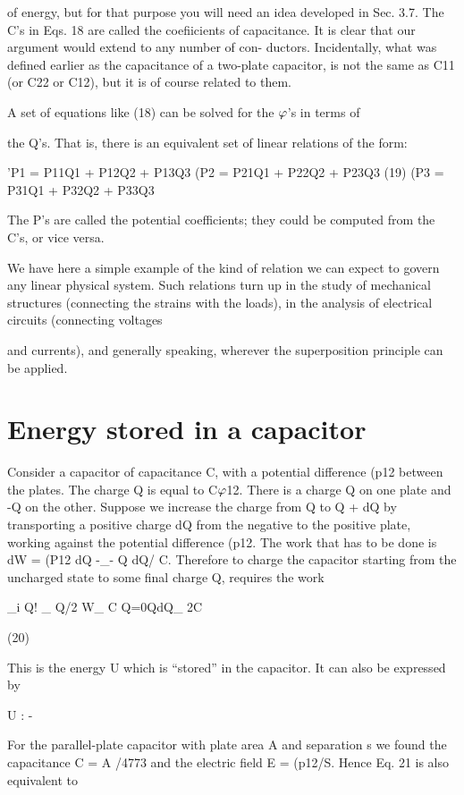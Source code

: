 of energy, but for that purpose you will need an idea developed in
Sec. 3.7. The C's in Eqs. 18 are called the coefiicients of capacitance.
It is clear that our argument would extend to any number of con-
ductors. Incidentally, what was defined earlier as the capacitance
of a two-plate capacitor, is not the same as C11 (or C22 or C12), but
it is of course related to them.

A set of equations like (18) can be solved for the $\varphi$'s in terms of

the Q's. That is, there is an equivalent set of linear relations of the
form:

'P1 = P11Q1 + P12Q2 + P13Q3
(P2 = P21Q1 + P22Q2 + P23Q3 (19)
(P3 = P31Q1 + P32Q2 + P33Q3

The P's are called the potential coefficients; they could be computed
from the C's, or vice versa.

We have here a simple example of the kind of relation we can
expect to govern any linear physical system. Such relations turn up
in the study of mechanical structures (connecting the strains with
the loads), in the analysis of electrical circuits (connecting voltages

and currents), and generally speaking, wherever the superposition
principle can be applied.

\section{Energy stored in a capacitor}

Consider a capacitor of capacitance C, with a potential difference
(p12 between the plates. The charge Q is equal to C$\varphi$12. There is a
charge Q on one plate and -Q on the other. Suppose we increase
the charge from Q to Q + dQ by transporting a positive charge dQ
from the negative to the positive plate, working against the potential
difference (p12. The work that has to be done is dW = (P12 dQ -_-
Q dQ/ C. Therefore to charge the capacitor starting from the uncharged
state to some final charge Q, requires the work

_i Q! _ Q/2
W_ C Q=0QdQ_ 2C

(20)

This is the energy U which is ``stored'' in the capacitor. It can also
be expressed by

U : -%

For the parallel-plate capacitor with plate area A and separation s
we found the capacitance C = A /4773 and the electric field E = (p12/S.
Hence Eq. 21 is also equivalent to


